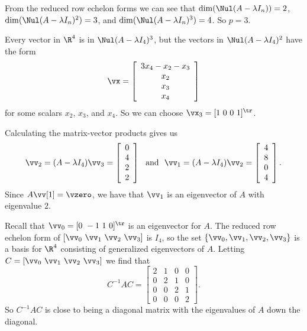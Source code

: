 \ActivitySolution
	\ba
	\item From the reduced row echelon forms we can see that $\dim(\Nul(A-\lambda I_n)) = 2$, $\dim(\Nul(A-\lambda I_n)^2) = 3$, and $\dim(\Nul(A-\lambda I_n)^3) = 4$. So $p = 3$. 
	
	\item  Every vector in $\R^4$ is in $\Nul (A - \lambda I_4)^3$, but the vectors in $\Nul (A - \lambda I_4)^2$ have the form 
\[\vx = \left[ \begin{array}{c} 3x_4-x_2-x_3 \\ x_2\\x_3\\x_4 \end{array} \right]\]
for some scalars $x_2$, $x_3$, and $x_4$. So we can choose $\vx_3 = [1 \ 0 \ 0 \ 1]^{\tr}$. 

	\item Calculating the matrix-vector products gives us
\[\vv_2 = (A-\lambda I_4) \vv_3 = \left[ \begin{array}{c} 0\\4\\2\\2 \end{array} \right] \ \text{ and } \  \vv_1 = (A-\lambda I_4) \vv_2 = \left[ \begin{array}{c} 4\\8\\0\\4 \end{array} \right].\]
Since $A \vv[1] = \vzero$, we have that $\vv_1$ is an eigenvector of $A$ with eigenvalue $2$.  
	
	\item Recall that $\vv_0 = [0 \ -1 \ 1 \ 0]^{\tr}$ is an eigenvector for $A$. The reduced row echelon form of  $[\vv_0 \ \vv_1 \ \vv_2 \ \vv_3]$ is $I_4$, so the set $\{\vv_0, \vv_1,\vv_2, \vv_3\}$ is a basis for $\R^4$ consisting of generalized eigenvectors of $A$. Letting $C = [\vv_0 \ \vv_1 \ \vv_2 \ \vv_3]$ we find that 
\[C^{-1}AC = \left[ \begin{array}{cccc} 2&1&0&0 \\ 0&2&1&0 \\ 0&0&2&1 \\ 0&0&0&2 \end{array} \right].\]
So $C^{-1}AC$ is close to being a diagonal matrix with the eigenvalues of $A$ down the diagonal.
	
	\ea
	
